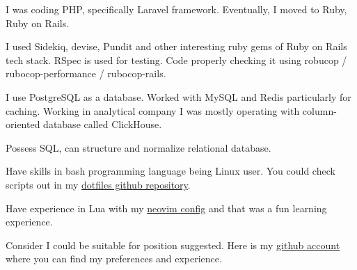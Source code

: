 
\begin{cvparagraph}

I was coding PHP, specifically Laravel framework.
Eventually, I moved to Ruby, Ruby on Rails.

I used Sidekiq, devise, Pundit and other interesting ruby gems of Ruby on Rails tech stack.
RSpec is used for testing.
Code properly checking it using robucop / rubocop-performance / rubocop-rails.

I use PostgreSQL as a database. Worked with MySQL and Redis particularly for caching.
Working in analytical company I was mostly operating with column-oriented database called ClickHouse.

Possess SQL, can structure and normalize relational database.

Have skills in bash programming language being Linux user.
You could check scripts out in my \href{https://github.com/wittyjudge/dotfiles/tree/master/.local/bin}{dotfiles github repository}.

Have experience in Lua with my \href{https://github.com/WIttyJudge/dotfiles/tree/master/.config/nvim}{neovim config} and that was a fun learning experience.

Consider I could be suitable for position suggested.
Here is my \href{https://github.com/wittyjudge}{github account} where you can find my preferences and experience.

\end{cvparagraph}
